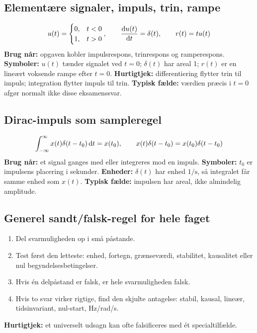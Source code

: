 \subsection{Elementære signaler, impuls, trin, rampe}
\[
u(t)=
\begin{cases}
0, & t<0\\
1, & t>0
\end{cases},
\qquad
\frac{\mathrm{d} u(t)}{\mathrm{d} t}=\delta(t),
\qquad
r(t)=t u(t)
\]
\textbf{Brug når:} opgaven kobler impulsrespons, trinrespons og ramperespons.
\textbf{Symboler:} \(u(t)\) tænder signalet ved \(t=0\); \(\delta(t)\) har areal 1; \(r(t)\) er en lineært voksende rampe efter \(t=0\).
\textbf{Hurtigtjek:} differentiering flytter trin til impuls; integration flytter impuls til trin.
\textbf{Typisk fælde:} værdien præcis i \(t=0\) afgør normalt ikke disse eksamenssvar.

\subsection{Dirac-impuls som sampleregel}
\[
\int_{-\infty}^{\infty}x(t)\delta(t-t_0)\,\mathrm{d} t=x(t_0),
\qquad
x(t)\delta(t-t_0)=x(t_0)\delta(t-t_0)
\]
\textbf{Brug når:} et signal ganges med eller integreres mod en impuls.
\textbf{Symboler:} \(t_0\) er impulsens placering i sekunder.
\textbf{Enheder:} \(\delta(t)\) har enhed \(1/\mathrm{s}\), så integralet får samme enhed som \(x(t)\).
\textbf{Typisk fælde:} impulsen har areal, ikke almindelig amplitude.

\subsection{Generel sandt/falsk-regel for hele faget}
\begin{enumerate}
    \item Del svarmuligheden op i små påstande.
    \item Test først den letteste: enhed, fortegn, grænseværdi, stabilitet, kausalitet eller nul begyndelsesbetingelser.
    \item Hvis én delpåstand er falsk, er hele svarmuligheden falsk.
    \item Hvis to svar virker rigtige, find den skjulte antagelse: stabil, kausal, lineær, tidsinvariant, nul-start, Hz/rad/s.
\end{enumerate}
\textbf{Hurtigtjek:} et universelt udsagn kan ofte falsificeres med ét specialtilfælde.
